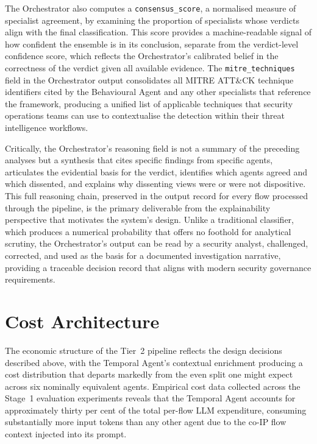 \documentclass[../main.tex]{subfiles}
\begin{document}
The Orchestrator also computes a \texttt{consensus\_score}, a normalised measure of specialist agreement, by examining the proportion of specialists whose verdicts align with the final classification. This score provides a machine-readable signal of how confident the ensemble is in its conclusion, separate from the verdict-level confidence score, which reflects the Orchestrator's calibrated belief in the correctness of the verdict given all available evidence. The \texttt{mitre\_techniques} field in the Orchestrator output consolidates all MITRE ATT\&CK technique identifiers cited by the Behavioural Agent and any other specialists that reference the framework, producing a unified list of applicable techniques that security operations teams can use to contextualise the detection within their threat intelligence workflows.

Critically, the Orchestrator's reasoning field is not a summary of the preceding analyses but a synthesis that cites specific findings from specific agents, articulates the evidential basis for the verdict, identifies which agents agreed and which dissented, and explains why dissenting views were or were not dispositive. This full reasoning chain, preserved in the output record for every flow processed through the pipeline, is the primary deliverable from the explainability perspective that motivates the system's design. Unlike a traditional classifier, which produces a numerical probability that offers no foothold for analytical scrutiny, the Orchestrator's output can be read by a security analyst, challenged, corrected, and used as the basis for a documented investigation narrative, providing a traceable decision record that aligns with modern security governance requirements.

\section{Cost Architecture}
\label{sec:cost-architecture}

The economic structure of the Tier~2 pipeline reflects the design decisions described above, with the Temporal Agent's contextual enrichment producing a cost distribution that departs markedly from the even split one might expect across six nominally equivalent agents. Empirical cost data collected across the Stage~1 evaluation experiments reveals that the Temporal Agent accounts for approximately thirty per cent of the total per-flow LLM expenditure, consuming substantially more input tokens than any other agent due to the co-IP flow context injected into its prompt.
\end{document}
